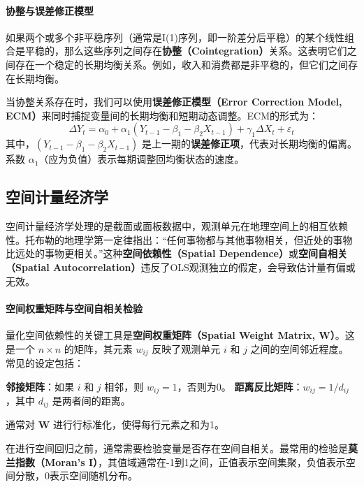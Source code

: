 \paragraph*{协整与误差修正模型}
如果两个或多个非平稳序列（通常是I(1)序列，即一阶差分后平稳）的某个线性组合是平稳的，那么这些序列之间存在\textbf{协整（Cointegration）}关系。这表明它们之间存在一个稳定的长期均衡关系。例如，收入和消费都是非平稳的，但它们之间存在长期均衡。

当协整关系存在时，我们可以使用\textbf{误差修正模型（Error Correction Model, ECM）}来同时捕捉变量间的长期均衡和短期动态调整。ECM的形式为：
\begin{equation}
\Delta Y_t = \alpha_0 + \alpha_1 (Y_{t-1} - \beta_1 - \beta_2 X_{t-1}) + \gamma_1 \Delta X_t + \varepsilon_t
\end{equation}
其中，$(Y_{t-1} - \beta_1 - \beta_2 X_{t-1})$ 是上一期的\textbf{误差修正项}，代表对长期均衡的偏离。系数 $\alpha_1$（应为负值）表示每期调整回均衡状态的速度。

\subsection{空间计量经济学}
空间计量经济学处理的是截面或面板数据中，观测单元在地理空间上的相互依赖性。托布勒的地理学第一定律指出：“任何事物都与其他事物相关，但近处的事物比远处的事物更相关。”这种\textbf{空间依赖性（Spatial Dependence）}或\textbf{空间自相关（Spatial Autocorrelation）}违反了OLS观测独立的假定，会导致估计量有偏或无效。

\paragraph*{空间权重矩阵与空间自相关检验}
量化空间依赖性的关键工具是\textbf{空间权重矩阵（Spatial Weight Matrix, W）}。这是一个 $n \times n$ 的矩阵，其元素 $w_{ij}$ 反映了观测单元 $i$ 和 $j$ 之间的空间邻近程度。常见的设定包括：

\textbf{邻接矩阵}：如果 $i$ 和 $j$ 相邻，则 $w_{ij}=1$，否则为0。
\textbf{距离反比矩阵}：$w_{ij} = 1/d_{ij}$，其中 $d_{ij}$ 是两者间的距离。

通常对 $\mathbf{W}$ 进行行标准化，使得每行元素之和为1。

在进行空间回归之前，通常需要检验变量是否存在空间自相关。最常用的检验是\textbf{莫兰指数（Moran's I）}，其值域通常在-1到1之间，正值表示空间集聚，负值表示空间分散，0表示空间随机分布。

